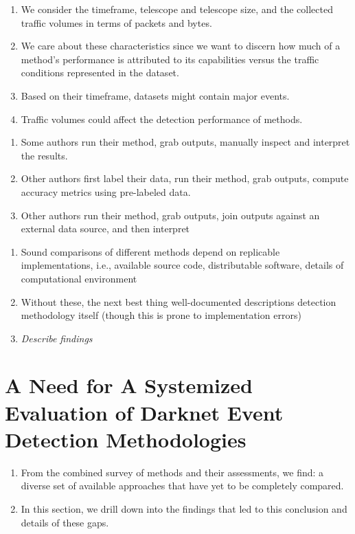 \documentclass[manuscript,nonacm]{acmart}
\begin{document}
\begin{enumerate}
    \item We consider the timeframe, telescope and telescope size, and the collected traffic volumes in terms of packets and bytes.
    \item We care about these characteristics since we want to discern how much of a method's performance is attributed to its capabilities versus the traffic conditions represented in the dataset.
    \item Based on their timeframe, datasets might contain major events.
    \item Traffic volumes could affect the detection performance of methods.
\end{enumerate}

\begin{enumerate}
    \item Some authors run their method, grab outputs, manually inspect and interpret the results.
    \item Other authors first label their data, run their method, grab outputs, compute accuracy metrics using pre-labeled data.
    \item Other authors run their method, grab outputs, join outputs against an external data source, and then interpret
\end{enumerate}

\begin{enumerate}
    \item Sound comparisons of different methods depend on replicable implementations, i.e., available source code, distributable software, details of computational environment
    \item Without these, the next best thing well-documented descriptions detection methodology itself (though this is prone to implementation errors)
    \item \textit{Describe findings}
\end{enumerate}

\section{A Need for A Systemized Evaluation of Darknet Event Detection Methodologies}

\begin{enumerate}
    \item From the combined survey of methods and their assessments, we find: a diverse set of available approaches that have yet to be completely compared.
    \item In this section, we drill down into the findings that led to this conclusion and details of these gaps.
\end{enumerate}
\end{document}
